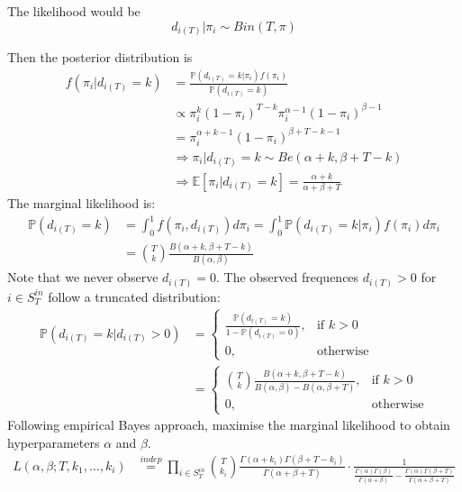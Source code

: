 \documentclass[a4paper, 12pt]{article}
\begin{document}
\begin{itemize}
    The likelihood would be
    \begin{equation*}
        d_{i(T)} |\pi_i \sim Bin(T, \pi)
    \end{equation*}
    
    Then the posterior distribution is
    \begin{align*}
        f(\pi_i | d_{i(T)} = k) &= \frac{\mathbb{P}(d_{i(T)} = k | \pi_i) f(\pi_i)}{\mathbb{P}(d_{i(T)} = k)} \\
        &\propto \pi_i^k(1 - \pi_i)^{T - k}\pi_i^{\alpha - 1}(1 - \pi_i)^{\beta - 1}\\
        &= \pi_i^{\alpha + k - 1}(1 - \pi_i)^{\beta + T - k - 1}\\
        &\Rightarrow \pi_i | d_{i(T)} = k \sim Be(\alpha + k, \beta + T - k)\\
        &\Rightarrow \mathbb{E}[\pi_i|d_{i(T)} = k] = \frac{\alpha + k}{\alpha + \beta + T}
    \end{align*}
    The marginal likelihood is:
    \begin{align*}
        \mathbb{P}(d_{i(T)} = k) &= \int_0^1 f(\pi_i, d_{i(T)})d\pi_i = \int_0^1 \mathbb{P}(d_{i(T)} = k | \pi_i)f(\pi_i)d\pi_i\\
        &= \binom{T}{k} \frac{B(\alpha + k, \beta + T - k)}{B(\alpha, \beta)}
    \end{align*}
    Note that we never observe $d_{i(T)} = 0$. The observed frequences $d_{i(T)} > 0$ for $i \in S_{T}^{in}$ follow a truncated distribution:
    \begin{align*}
    \mathbb{P}(d_{i(T)} = k | d_{i(T)} > 0) &= 
    \begin{cases}
        \frac{\mathbb{P}(d_{i(T)} = k)}{1 - \mathbb{P}(d_{i(T)} = 0)},& \text{if } k > 0 \\
        0, & \text{otherwise}
    \end{cases}\\
    &=
    \begin{cases}
        \binom{T}{k} \frac{B(\alpha + k, \beta + T - k)}{B(\alpha, \beta) - B(\alpha, \beta + T)},& \text{if } k > 0 \\
        0, & \text{otherwise}
    \end{cases}
    \end{align*}
    Following empirical Bayes approach, maximise the marginal likelihood to obtain hyperparameters $\alpha$ and $\beta$.
    \begin{align*}
        L(\alpha, \beta; T, k_1, \dots, k_i) &\overset{indep}{=} \prod_{i \in S_T^{in}} \binom{T}{k_i} \frac{\Gamma(\alpha + k_i)\Gamma(\beta + T - k_i)}{\Gamma(\alpha + \beta + T)} \cdot \frac{1}{\frac{\Gamma(\alpha)\Gamma(\beta)}{\Gamma(\alpha + \beta)} - \frac{\Gamma(\alpha)\Gamma(\beta + T)}{\Gamma(\alpha + \beta + T)}} \\

\end{align*}
\end{itemize}
\end{document}
